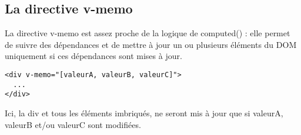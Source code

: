 \subsection{La directive v-memo}
La directive {\color{monOrange}v-memo} est assez proche de la logique de {\color{monOrange}computed()} : elle permet de suivre des dépendances et de mettre à jour un ou plusieurs éléments du DOM uniquement si ces dépendances sont mises à jour.
\begin{verbatim}
<div v-memo="[valeurA, valeurB, valeurC]">
  ...
</div>
\end{verbatim}
Ici, la {\color{monOrange}div} et tous les éléments imbriqués, ne seront mis à jour que si {\color{monOrange}valeurA, valeurB} et/ou {\color{monOrange}valeurC} sont modifiées.





